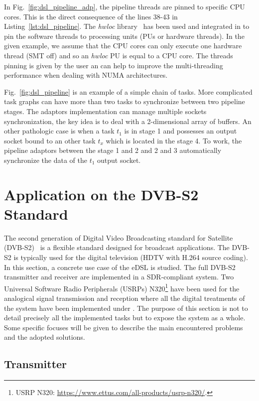 In Fig.~\ref{fig:dsl_pipeline_adp}, the pipeline threads are pinned to specific
CPU cores. This is the direct consequence of the lines 38-43 in
Listing~\ref{lst:dsl_pipeline}. The \emph{hwloc} library~\cite{Broquedis2010}
has been used and integrated in \AFFECT to pin the software threads to
processing units (PUs or hardware threads). In the given example, we assume that
the CPU cores can only execute one hardware thread (SMT off) and so an
\emph{hwloc} PU is equal to a CPU core. The threads pinning is given by the user
an can help to improve the multi-threading performance when dealing with NUMA
architectures.

Fig.~\ref{fig:dsl_pipeline} is an example of a simple chain of tasks. More
complicated task graphs can have more than two tasks to synchronize between two
pipeline stages. The adaptors implementation can manage multiple sockets
synchronization, the key idea is to deal with a 2-dimensional array of buffers.
An other pathologic case is when a task $t_1$ is in stage 1 and possesses an
output socket bound to an other task $t_{x}$ which is located in the stage 4.
To work, the pipeline adaptors between the stage 1 and 2 and 2 and 3
automatically synchronize the data of the $t_1$ output socket.

\section{Application on the DVB-S2 Standard}

The second generation of Digital Video Broadcasting standard for Satellite
(DVB-S2)~\cite{ETSI2005} is a flexible standard designed for broadcast
applications. The DVB-S2 is typically used for the digital television (HDTV
with H.264 source coding). In this section, a concrete use case of the \AFFECT
eDSL is studied. The full DVB-S2 transmitter and receiver are implemented in a
SDR-compliant system. Two Universal Software Radio Peripherals (USRPs)
N320\footnote{USRP N320: \url{https://www.ettus.com/all-products/usrp-n320/}.}
have been used for the analogical signal transmission and reception where all
the digital treatments of the system have been implemented under \AFFECT. The
purpose of this section is not to detail precisely all the implemented tasks
but to expose the system as a whole. Some specific focuses will be given to
describe the main encountered problems and the adopted solutions.

\subsection{Transmitter}

